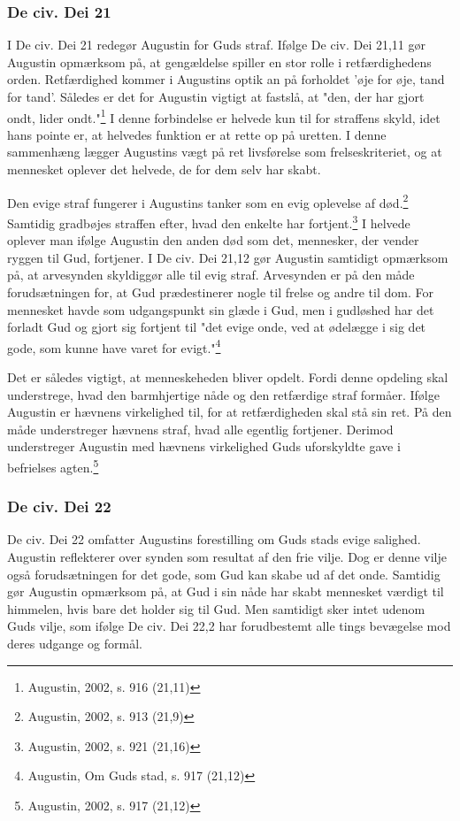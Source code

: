 \subsubsection{De civ. Dei 21}
I De civ. Dei 21 redegør Augustin for Guds straf. Ifølge De civ. Dei 21,11 gør Augustin opmærksom på, at gengældelse spiller en stor rolle i retfærdighedens orden. Retfærdighed kommer i Augustins optik an på forholdet 'øje for øje, tand for tand'. Således er det for Augustin vigtigt at fastslå, at "den, der har gjort ondt, lider ondt."\footnote{Augustin, 2002, s. 916 (21,11)} I denne forbindelse er helvede kun til for straffens skyld, idet hans pointe er, at helvedes funktion er at rette op på uretten. I denne sammenhæng lægger Augustins vægt på ret livsførelse som frelseskriteriet, og at mennesket oplever det helvede, de for dem selv har skabt.

Den evige straf fungerer i Augustins tanker som en evig oplevelse af død.\footnote{Augustin, 2002, s. 913 (21,9)} Samtidig gradbøjes straffen efter, hvad den enkelte har fortjent.\footnote{Augustin, 2002, s. 921 (21,16)} I helvede oplever man ifølge Augustin den anden død som det, mennesker, der vender ryggen til Gud, fortjener. I De civ. Dei 21,12 gør Augustin samtidigt opmærksom på, at arvesynden skyldiggør alle til evig straf. Arvesynden er på den måde forudsætningen for, at Gud prædestinerer nogle til frelse og andre til dom. For mennesket havde som udgangspunkt sin glæde i Gud, men i gudløshed har det forladt Gud og gjort sig fortjent til "det evige onde, ved at ødelægge i sig det gode, som kunne have varet for evigt."\footnote{Augustin, Om Guds stad, s. 917 (21,12)}

Det er således vigtigt, at menneskeheden bliver opdelt. Fordi denne opdeling skal understrege, hvad den barmhjertige nåde og den retfærdige straf formåer. Ifølge Augustin er hævnens virkelighed til, for at retfærdigheden skal stå sin ret. På den måde understreger hævnens straf, hvad alle egentlig fortjener. Derimod understreger Augustin med hævnens virkelighed Guds uforskyldte gave i befrielses agten.\footnote{Augustin, 2002, s. 917 (21,12)}

\subsubsection{De civ. Dei 22}
De civ. Dei 22 omfatter Augustins forestilling om Guds stads evige salighed. Augustin reflekterer over synden som resultat af den frie vilje. Dog er denne vilje også forudsætningen for det gode, som Gud kan skabe ud af det onde. Samtidig gør Augustin opmærksom på, at Gud i sin nåde har skabt mennesket værdigt til himmelen, hvis bare det holder sig til Gud. Men samtidigt sker intet udenom Guds vilje, som ifølge De civ. Dei 22,2 har forudbestemt alle tings bevægelse mod deres udgange og formål.

